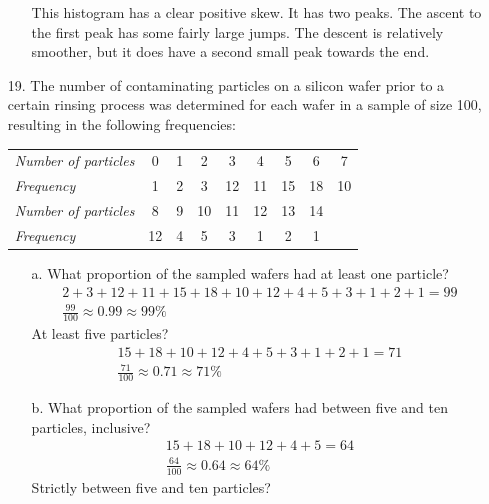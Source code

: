 \documentclass[letterpaper,12pt]{article}
\begin{document}
\begin{enumerate}
\begin{enumerate}
        This histogram has a clear positive skew. It has two peaks. The ascent to the first peak has some fairly large jumps. The descent is relatively smoother, but it does have a second small peak towards the end.
    \end{enumerate}
  \item[19.]
    The number of contaminating particles on a silicon wafer prior to a certain rinsing process was determined for each wafer in a sample of size 100, resulting in the following frequencies:
    \begin{center}
      \begin{tabular}{
        >{\itshape}l
        S[table-format=2.0]
        S[table-format=2.0]
        S[table-format=2.0]
        S[table-format=2.0]
        S[table-format=2.0]
        S[table-format=2.0]
        S[table-format=2.0]
        S[table-format=2.0]
      }
        Number of particles & 0 & 1 & 2 & 3 & 4 & 5 & 6 & 7 \\
        Frequency & 1 & 2 & 3 & 12 & 11 & 15 & 18 & 10 \\
        Number of particles & 8 & 9 & 10 & 11 & 12 & 13 & 14 \\
        Frequency & 12 & 4 & 5 & 3 & 1 & 2 & 1
      \end{tabular}
    \end{center}
    \begin{enumerate}
      \item[a.]
        What proportion of the sampled wafers had at least one particle?
        \begin{align*}
          2 + 3 + 12 + 11 + 15 + 18 + 10 + 12 + 4 + 5 + 3 + 1 + 2 + 1 = 99 \\
          \frac{99}{100} \approx 0.99 \approx 99\%
        \end{align*}
        At least five particles?
        \begin{align*}
          15 + 18 + 10 + 12 + 4 + 5 + 3 + 1 + 2 + 1 = 71 \\
          \frac{71}{100} \approx 0.71 \approx 71\%
        \end{align*}
      \item[b.]
        What proportion of the sampled wafers had between five and ten particles, inclusive?
        \begin{align*}
          15 + 18 + 10 + 12 + 4 + 5 = 64 \\
          \frac{64}{100} \approx 0.64 \approx 64\%
        \end{align*}
        Strictly between five and ten particles?

\end{enumerate}
\end{enumerate}
\end{document}

